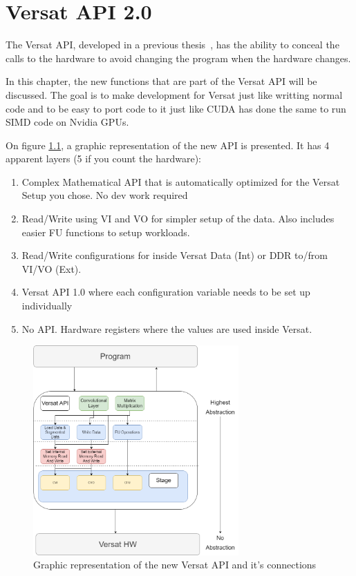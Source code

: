 \chapter{Versat API 2.0}
\label{chapter:API}

The Versat API, developed in a previous thesis~\cite{valter:deepversat}, has the ability to conceal
the calls to the hardware to avoid changing the program when the hardware changes. 

In this chapter, the new functions that are part of the Versat API will be discussed. The goal
is to make development for Versat just like writting normal code and to be easy to port code to it just like
CUDA has done the same to run SIMD code on Nvidia GPUs.




On figure \ref{newAPI}, a graphic representation of the new API is presented. It has 4 apparent layers (5 if you count the hardware):

\begin{enumerate}
	\item Complex Mathematical API that is automatically optimized for the Versat Setup you chose. No dev work required
	\item Read/Write using VI and VO for simpler setup of the data. Also includes easier FU functions to setup workloads.
	\item Read/Write configurations for inside Versat Data (Int) or DDR to/from VI/VO (Ext).
	\item Versat API 1.0 where each configuration variable needs to be set up individually
	\item No API. Hardware registers where the values are used inside Versat. 
  \end{enumerate}


\begin{figure}[!htbp]
    \centering
    \includegraphics[width=0.7\textwidth]{Figures/VersatMemory.drawio.png}
    \caption{Graphic representation of the new Versat API and it's connections}
    \label{newAPI}
\end{figure} 


